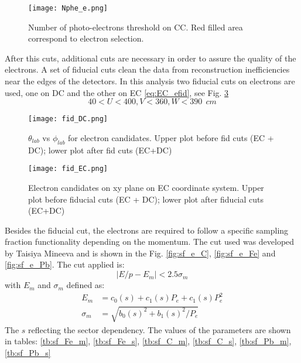 \begin{figure}[!ht]
\centering
\texttt{[image: Nphe\_e.png]}
\caption{Number of photo-electrons threshold on CC. Red filled area correspond to electron selection.}
\label{fig:Nphe_e}
\end{figure}

After this cuts, additional cuts are necessary in order to assure the quality of the electrons. A set of fiducial cuts clean the data from reconstruction inefficiencies near the edges of the detectors. In this analysis two fiducial cuts on electrons are used, one on DC \cite{Lorenzo_analysis_note} and the other on EC \eqref{eq:EC_efid}, see Fig. \ref{fig:fid_e_EC}
\begin{equation}
40<U<400,V<360,W<390~~cm
\label{eq:EC_efid}
\end{equation}
\begin{figure}[!ht]
\centering
\texttt{[image: fid\_DC.png]}
\caption{$\theta_{lab}$ vs $\phi_{lab}$ for electron candidates. Upper plot before fid cuts (EC + DC); lower plot after fid cuts (EC+DC)}
\label{fig:fid_e_DC}
\end{figure}
%
\begin{figure}[!ht]
\centering
\texttt{[image: fid\_EC.png]}
\caption{Electron candidates on xy plane on EC coordinate system. Upper plot before fiducial cuts (EC + DC); lower plot after fiducial cuts (EC+DC)}
\label{fig:fid_e_EC}
\end{figure}
%
Besides the fiducial cut, the electrons are required to follow a specific sampling fraction functionality depending on the momentum. The cut used was developed by Taisiya Mineeva \cite{Taya_analysis_note} and is shown in the Fig. \ref{fig:sf_e_C}, \ref{fig:sf_e_Fe} and \ref{fig:sf_e_Pb}. The cut applied is:
\begin{equation}
\lvert E/p - E_{m} \rvert < 2.5 \sigma_{m}
\end{equation}
with  $E_{m}$ and $\sigma_{m}$ defined as:
\begin{align}
E_{m} &=  c_0(s) + c_1(s)P_e + c_1(s)P_e^2\\
\sigma_m &= \sqrt{b_0(s)^2 + b_1(s)^2/P_e}
\end{align}
The $s$ reflecting the sector dependency. The values of the parameters are shown in tables: \ref{tb:sf_Fe_m}, \ref{tb:sf_Fe_s}, \ref{tb:sf_C_m}, \ref{tb:sf_C_s}, \ref{tb:sf_Pb_m}, \ref{tb:sf_Pb_s}\\

